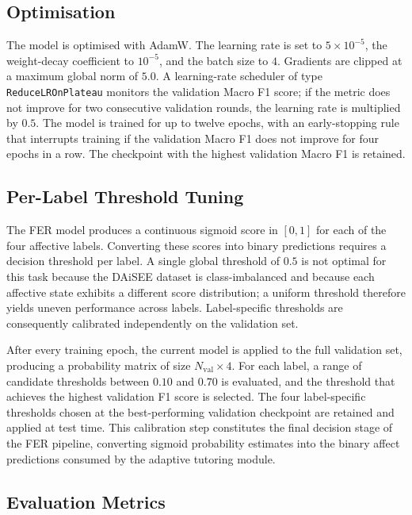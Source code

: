 \subsection{Optimisation}\label{sec:method_optim}

The model is optimised with AdamW. The learning rate is set to $5 \times 10^{-5}$, the weight-decay coefficient to $10^{-5}$, and the batch size to $4$. Gradients are clipped at a maximum global norm of $5.0$. A learning-rate scheduler of type \texttt{ReduceLROnPlateau} monitors the validation Macro F1 score; if the metric does not improve for two consecutive validation rounds, the learning rate is multiplied by $0.5$. The model is trained for up to twelve epochs, with an early-stopping rule that interrupts training if the validation Macro F1 does not improve for four epochs in a row. The checkpoint with the highest validation Macro F1 is retained.

\subsection{Per-Label Threshold Tuning}\label{sec:method_thresholds}

The \ac{FER} model produces a continuous sigmoid score in $[0,1]$ for each of the four affective labels. Converting these scores into binary predictions requires a decision threshold per label. A single global threshold of $0.5$ is not optimal for this task because the \ac{DAiSEE} dataset is class-imbalanced and because each affective state exhibits a different score distribution; a uniform threshold therefore yields uneven performance across labels. Label-specific thresholds are consequently calibrated independently on the validation set.

After every training epoch, the current model is applied to the full validation set, producing a probability matrix of size $N_{\mathrm{val}} \times 4$. For each label, a range of candidate thresholds between $0.10$ and $0.70$ is evaluated, and the threshold that achieves the highest validation F1 score is selected. The four label-specific thresholds chosen at the best-performing validation checkpoint are retained and applied at test time. This calibration step constitutes the final decision stage of the \ac{FER} pipeline, converting sigmoid probability estimates into the binary affect predictions consumed by the adaptive tutoring module.

\subsection{Evaluation Metrics}\label{sec:method_metrics}

